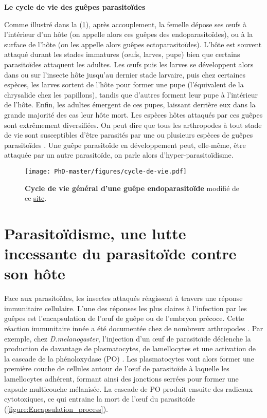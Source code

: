 \textbf{Le cycle de vie des guêpes parasitoïdes}

Comme illustré dans la (\figurename{\ref{figure:cycle-de-vie}}), après accouplement, la femelle dépose ses œufs à l’intérieur d’un hôte (on appelle alors ces guêpes des endoparasitoïdes), ou à la surface de l’hôte (on les appelle alors guêpes ectoparasitoïdes). L'hôte est souvent attaqué durant les stades immatures (œufs, larves, pupe) bien que certains parasitoïdes attaquent les adultes. Les œufs puis les larves se développent alors dans ou sur l'insecte hôte jusqu'au dernier stade larvaire, puis chez certaines espèces, les larves sortent de l’hôte pour former une pupe (l’équivalent de la chrysalide chez les papillons), tandis que d'autres forment leur pupe à l'intérieur de l'hôte. Enfin, les adultes émergent de ces pupes, laissant derrière eux dans la grande majorité des cas leur hôte mort. Les espèces hôtes attaqués par ces guêpes sont extrêmement diversifiées. On peut dire que tous les arthropodes à tout stade de vie sont susceptibles d’être parasités par une ou plusieurs espèces de guêpes parasitoïdes \citep{capinera_carabid_2008}. Une guêpe parasitoïde en développement peut, elle-même, être attaquée par un autre parasitoïde, on parle alors d’hyper-parasitoïdisme. 

\begin{figure}[!htpbt]
\captionsetup{font=footnotesize}
 \centering
  \texttt{[image: PhD-master/figures/cycle-de-vie.pdf]}
\caption[Intro:Cycle de vie général d'une guêpe endoparasitoïde]{\textbf{Cycle de vie général d'une guêpe endoparasitoïde} modifié de ce \href{https://www.sciencelearn.org.nz/resources/2770-parasitoid-wasp-life-cycle}{site}.}
\label{figure:cycle-de-vie}
\end{figure}

\section{Parasitoïdisme, une lutte incessante du parasitoïde contre son hôte}

Face aux parasitoïdes, les insectes  attaqués réagissent à travers une réponse immunitaire cellulaire. L'une des réponses les plus claires à l'infection par les guêpes est l'encapsulation de l'œuf de guêpe ou de l'embryon précoce. Cette réaction immunitaire innée a été documentée chez de nombreux arthropodes \citep{brehlin_immune_1988}. Par exemple, chez \textit{D.melanogaster}, l'injection d'un œuf de parasitoïde déclenche la production de davantage de plasmatocytes, de lamellocytes et une activation de la cascade de la phénoloxydase (PO) \citep{kim-jo_drosophila_2019}. Les plasmatocytes vont alors former une première couche de cellules autour de l'œuf de parasitoïde à laquelle les lamellocytes adhérent, formant ainsi des jonctions serrées pour former une capsule multicouche mélanisée. La cascade de PO produit ensuite des radicaux cytotoxiques, ce qui entraine la mort de l'œuf du parasitoïde \citep{kim-jo_drosophila_2019} (\figurename{\ref{figure:Encapsulation_process}}). 

